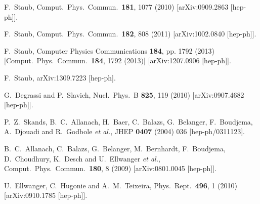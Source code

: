 \documentclass[final,3p,11pt,pdflatex]{elsarticle}
\begin{document}
\begin{thebibliography}{100}
  F.~Staub,
  Comput.\ Phys.\ Commun.\  {\bf 181}, 1077 (2010)
  [arXiv:0909.2863 [hep-ph]].

  F.~Staub,
  Comput.\ Phys.\ Commun.\  {\bf 182}, 808 (2011)
  [arXiv:1002.0840 [hep-ph]].

  F.~Staub,
  Computer Physics Communications {\bf 184}, pp. 1792 (2013)
  [Comput.\ Phys.\ Commun.\  {\bf 184}, 1792 (2013)]
  [arXiv:1207.0906 [hep-ph]].

  F.~Staub,
  arXiv:1309.7223 [hep-ph].

  G.~Degrassi and P.~Slavich,
  Nucl.\ Phys.\ B {\bf 825}, 119 (2010)
  [arXiv:0907.4682 [hep-ph]].

  P.~Z.~Skands, B.~C.~Allanach, H.~Baer, C.~Balazs, G.~Belanger, F.~Boudjema, A.~Djouadi and R.~Godbole {\it et al.},
  JHEP {\bf 0407} (2004) 036
  [hep-ph/0311123].

  B.~C.~Allanach, C.~Balazs, G.~Belanger, M.~Bernhardt, F.~Boudjema, D.~Choudhury, K.~Desch and U.~Ellwanger {\it et al.},
  Comput.\ Phys.\ Commun.\  {\bf 180}, 8 (2009)
  [arXiv:0801.0045 [hep-ph]].

  U.~Ellwanger, C.~Hugonie and A.~M.~Teixeira,
  Phys.\ Rept.\  {\bf 496}, 1 (2010)
  [arXiv:0910.1785 [hep-ph]].


\end{thebibliography}
\end{document}
